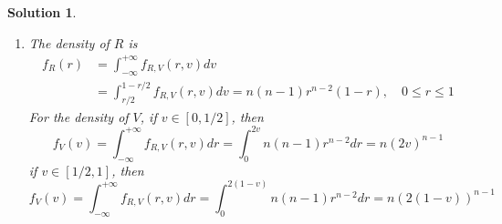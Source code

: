 \documentclass[12pt]{amsart}
\newtheorem*{solution}{Solution}
\begin{document}
\begin{solution}
\begin{enumerate}[label=(\alph*)]
$$$$
thus the joint density of $(R, V)$ is
\begin{align*}
f_{R, V}(r, v) & =f(x_1, x_n) \times|\operatorname{det} A| \\
& =f(v-\frac{r}{2}, v+\frac{r}{2}) \\
& =n(n-1) r^{n-2},
\end{align*}
where $(r, v) \in D \equiv\{(r, v): 0 \leq v-\frac{r}{2} \leq v+\frac{r}{2} \leq 1\}$ and
$$
f_{R, V}(r, v)=0
$$
if $(r, v) \notin D$.
\item The density of $R$ is
\begin{align*}
f_R(r) & =\int_{-\infty}^{+\infty} f_{R, V}(r, v) d v \\
& =\int_{r / 2}^{1-r / 2} f_{R, V}(r, v) d v=n(n-1) r^{n-2}(1-r), \quad 0 \leq r \leq 1
\end{align*}
For the density of $V$, if $v \in[0,1 / 2]$, then
$$
f_V(v)=\int_{-\infty}^{+\infty} f_{R, V}(r, v) d r=\int_0^{2 v} n(n-1) r^{n-2} d r=n(2 v)^{n-1}
$$
if $v \in[1 / 2,1]$, then
$$
f_V(v)=\int_{-\infty}^{+\infty} f_{R, V}(r, v) d r=\int_0^{2(1-v)} n(n-1) r^{n-2} d r=n(2(1-v))^{n-1}
$$
\end{enumerate}
\end{solution}
\end{document}
